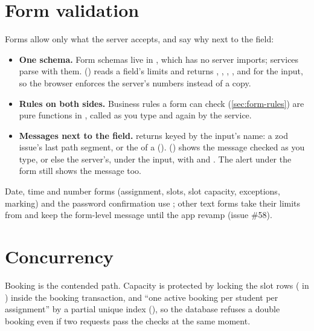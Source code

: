 \section{Form validation}\label{sec:form-validation}
Forms allow only what the server accepts, and say why next to the field:
\begin{itemize}
  \item \textbf{One schema.} Form schemas live in , which has no
    server imports; services parse with them. 
    () reads a field's limits and returns ,
    , , ,  and  for the input, so
    the browser enforces the server's numbers instead of a copy.
  \item \textbf{Rules on both sides.} Business rules a form can check (\cref{sec:form-rules}) are
    pure functions in , called as you type and again by the service.
  \item \textbf{Messages next to the field.}  returns  keyed by the
    input's name: a zod issue's last path segment, or the  of a 
    ().  ()
    shows the message checked as you type, or else the server's, under the input, with
     and . The alert under the form still shows the
    message too.
\end{itemize}
Date, time and number forms (assignment, slots, slot capacity, exceptions, marking) and the
password confirmation use ; other text forms take their limits from
 and keep the form-level message until the app revamp (issue \#58).

\section{Concurrency}
Booking is the contended path. Capacity is protected by locking the slot rows
( in ) inside the booking transaction, and
\enquote{one active booking per student per assignment} by a partial unique index
(), so the database refuses a double booking even if two
requests pass the checks at the same moment.

